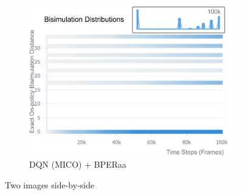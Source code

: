 \begin{figure}[h]
\begin{subfigure}{0.32\textwidth}
        \includegraphics[width=\linewidth]{Results/grid_world/exact_bisimulation_dqn_mico_bperaa.png}
        \caption{DQN (MICO) + BPERaa}
        \label{fig:exact_bisim_bperaa}
    \end{subfigure}
    \caption{Two images side-by-side}
    \label{fig:exact_bisimulation_distributions}
\end{figure}

